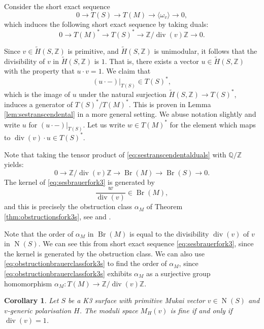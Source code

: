 \documentclass[11pt,twoside]{amsart}
\numberwithin{equation}{section}
\newtheorem{corollary}[dummy]{Corollary}
\theoremstyle{definition}
\theoremstyle{plain}
\newcommand{\Z}{\ensuremath{\mathbb{Z}}}
\newcommand{\Q}{\ensuremath{\mathbb{Q}}}
\def\Br{\operatorname{Br}}
\def\N{\operatorname{N}}
\def\dv{\operatorname{div}}
\begin{document}
Consider the short exact sequence 
\begin{equation}\label{eq:sestranscendentalfork3s}
    0\to T(S) \to T(M) \to \langle \omega_v\rangle \to 0,
\end{equation}
which induces the following short exact sequence by taking duals:
\begin{equation}\label{eq:sestranscendentalduals}
    0 \to T(M)^* \to T(S)^* \to \Z/\dv(v)\Z \to 0.
\end{equation}

Since $v\in \tilde{H}(S,\Z)$ is primitive, and $\tilde{H}(S,\Z)$ is unimodular, it follows that the divisibility of $v$ in $\tilde{H}(S,\Z)$ is $1$. That is, there exists a vector $u\in \tilde{H}(S,\Z)$ with the property that $u\cdot v = 1$. 
We claim that $$(u\cdot -)|_{T(S)} \in T(S)^*,$$ which is the image of $u$ under the natural surjection $\tilde{H}(S,\Z) \to T(S)^*$, induces a generator of $T(S)^*/T(M)^*$. This is proven in Lemma \ref{lem:sestranscendental} in a more general setting. We abuse notation slightly and write $u$ for $(u\cdot -)|_{T(S)}$. Let us write $w\in T(M)^*$ for the element which maps to $\dv(v)\cdot u \in T(S)^*$.

Note that taking the tensor product of \eqref{eq:sestranscendentalduals} with $\Q/\Z$ yields:
\begin{equation}\label{eq:sesbrauerfork3}
    0 \to \Z/\dv(v)\Z \to \Br(M) \to \Br(S) \to 0.
\end{equation}
The kernel of \eqref{eq:sesbrauerfork3} is generated by $$\frac{w}{\dv(v)} \in \Br(M),$$ and this is precisely the obstruction class $\alpha_M$ of Theorem \ref{thm:obstructionsfork3s}, see \cite{Cal00} and \cite{MS24}. 

Note that the order of $\alpha_M$ in $\Br(M)$ is equal to the divisibility $\dv(v)$ of $v$ in $\N(S)$. We can see this from short exact sequence \eqref{eq:sesbrauerfork3}, since the kernel is generated by the obstruction class. We can also use \eqref{eq:obstructionbrauerclassfork3s} to find the order of $\alpha_M$, since \eqref{eq:obstructionbrauerclassfork3s} exhibits $\alpha_M$ as a surjective group homomorphism $\alpha_M\colon T(M)\to \Z/\dv(v)\Z$.

\begin{corollary} \cite{Cal00} \label{cor:fineiffdivoneindimensiontwo}
    Let $S$ be a K3 surface with primitive Mukai vector $v\in \N(S)$ and $v$-generic polarisation $H$. The moduli space $M_H(v)$ is fine if and only if $\dv(v)=1$.
\end{corollary}
\end{document}
